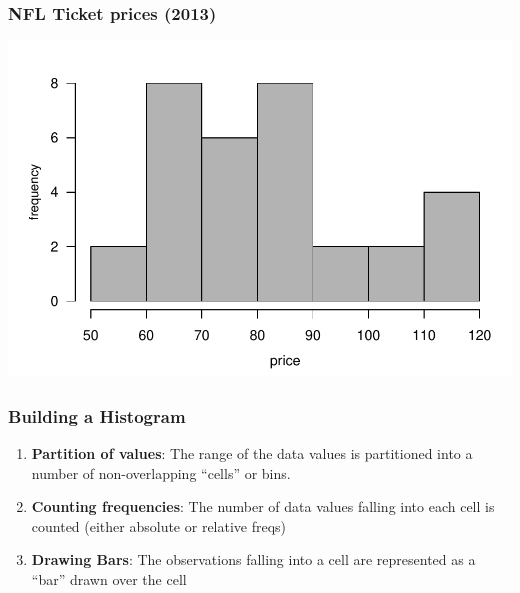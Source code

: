 \documentclass[12pt]{beamer}\usepackage[]{graphicx}\usepackage[]{color}
\newenvironment{knitrout}{}{} %
\begin{document}
\begin{frame}[fragile]
\frametitle{NFL Ticket prices (2013)}
\begin{knitrout}\footnotesize
{}\color{fgcolor}

{\centering \includegraphics[width=.8\linewidth,height=.6\linewidth]{figure/unnamed-chunk-18-1} 

}



\end{knitrout}

\end{frame}


\begin{frame}
\frametitle{Building a Histogram}

\begin{enumerate}
  \item \textbf{Partition of values}: The range of the data values is partitioned into a number of non-overlapping ``cells'' or bins.
  \item \textbf{Counting frequencies}: The number of data values falling into each cell is counted (either absolute or relative freqs)
  \item \textbf{Drawing Bars}: The observations falling into a cell are represented as a ``bar'' drawn over the cell
\end{enumerate}

\end{frame}

\end{document}
